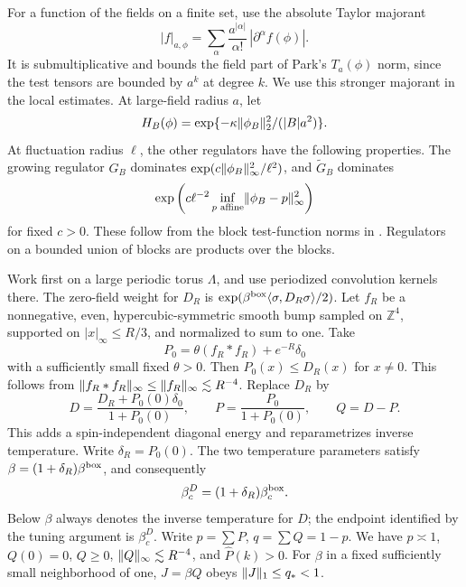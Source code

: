 \documentclass[11pt]{article}
\newcommand{\Z}{\mathbb Z}
\DeclarePairedDelimiter{\norm}{\lVert}{\rVert}
\begin{document}
For a function of the fields on a finite set, use the absolute Taylor majorant
\[
 |f|_{a,\phi}=\sum_{\alpha}
 \frac{a^{|\alpha|}}{\alpha!}\,|\partial^\alpha f(\phi)|.
\]
It is submultiplicative and bounds the field part of Park's \(T_a(\phi)\) norm, since the test tensors are bounded by \(a^k\) at degree \(k\). We use this stronger majorant in the local estimates. At large-field radius \(a\), let
\[
 H_B(\phi)=\exp\{-\kappa\norm{\phi_B}_2^2/(|B|a^2)\}.
\]
At fluctuation radius \(\ell\), the other regulators have the following properties. The growing regulator \(G_B\) dominates \(\exp(c\norm{\phi_B}_\infty^2/\ell^2)\), and \(\widetilde G_B\) dominates
\[
 \exp\left(c\ell^{-2}\inf_{p\text{ affine}}
                 \norm{\phi_B-p}_\infty^2\right)
\]
for fixed \(c>0\). These follow from the block test-function norms in \cite[\S 2.4]{ParkMap}. Regulators on a bounded union of blocks are products over the blocks.

Work first on a large periodic torus \(\Lambda\), and use
periodized convolution kernels there. The zero-field weight for
\(D_R\) is \(\exp(\beta^{\rm box}\langle\sigma,D_R\sigma\rangle/2)\). Let \(f_R\) be a nonnegative, even, hypercubic-symmetric smooth bump sampled on \(\Z^4\), supported on \(|x|_\infty\le R/3\), and normalized to sum to one. Take
\[
 P_0=\theta(f_R*f_R)+e^{-R}\delta_0
\]
with a sufficiently small fixed \(\theta>0\). Then \(P_0(x)\le D_R(x)\) for \(x\ne0\). This follows from \(\norm{f_R*f_R}_\infty\le\norm{f_R}_\infty\lesssim R^{-4}\). Replace \(D_R\) by
\[
 D=\frac{D_R+P_0(0)\delta_0}{1+P_0(0)},\qquad
 P=\frac{P_0}{1+P_0(0)},\qquad Q=D-P .
\]
This adds a spin-independent diagonal energy and reparametrizes inverse temperature. Write \(\delta_R=P_0(0)\). The two temperature parameters satisfy
\(\beta=(1+\delta_R)\beta^{\rm box}\), and consequently
\[
 \beta_c^D=(1+\delta_R)\beta_c^{\rm box}.
\]
Below \(\beta\) always denotes the inverse temperature for \(D\);
the endpoint identified by the tuning argument is \(\beta_c^D\). Write \(p=\sum P\), \(q=\sum Q=1-p\). We have \(p\asymp1\), \(Q(0)=0\), \(Q\ge0\), \(\norm{Q}_\infty\lesssim R^{-4}\), and \(\widehat P(k)>0\). For \(\beta\) in a fixed sufficiently small neighborhood of one, \(J=\beta Q\) obeys \(\norm{J}_1\le q_*<1\).
\end{document}
